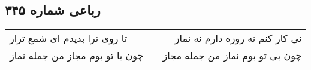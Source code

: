 \begin{center}
\section*{رباعی شماره ۳۴۵}
\label{sec:sh345}
\begin{longtable}{l p{0.5cm} r}
تا روی ترا بدیدم ای شمع تراز
&&
نی کار کنم نه روزه دارم نه نماز
\\
چون با تو بوم مجاز من جمله نماز
&&
چون بی تو بوم نماز من جمله مجاز
\\
\end{longtable}
\end{center}
